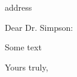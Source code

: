 \documentclass{letter}
\begin{document}
\begin{letter}{address}
\opening{Dear Dr. Simpson:}

Some text

\closing{Yours truly,}
\end{letter}
\end{document}
